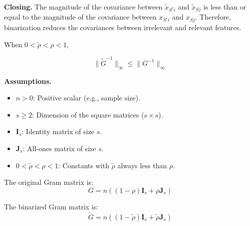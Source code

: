 \noindent\textbf{Closing.}
The magnitude of the covariance between $ \tilde{x}_{{S^c}i} $ and $ \tilde{x}_{Sj} $ is less than or equal to the magnitude of the covariance between $ x_{{S^c}i} $ and $ x_{Sj} $. Therefore, binarization reduces the covariances between irrelevant and relevant features.


\begin{lemma}\label{lem:app-inverse-norm-bound}
When $ 0 < \tilde{\rho} < \rho < 1 $,

\begin{equation}\label{eq:app-lemma4-inverse-norm-goal}
\|\tilde{G}^{-1}\|_\infty \leq  \|G^{-1}\|_\infty 
\end{equation}
\end{lemma}

\noindent\textbf{Assumptions.}

{
	\small
	\begin{itemize}
		\item $ n > 0 $: Positive scalar (e.g., sample size).
		\item $ s \geq 2 $: Dimension of the square matrices ($ s \times s $).
		\item $ \mathbf{I}_s $: Identity matrix of size $ s $.
		\item $ \mathbf{J}_s $: All-ones matrix of size $ s $.
		\item $ 0 < \tilde{\rho} < \rho < 1 $: Constants with $ \tilde{\rho} $ always less than $ \rho $.
	\end{itemize}
}

The original Gram matrix is:
\begin{equation}\label{eq:app-lemma4-raw-gram}
G = n \left( (1 - \rho) \mathbf{I}_s + \rho \mathbf{J}_s \right)
\end{equation}

The binarized Gram matrix is:
\begin{equation}\label{eq:app-lemma4-binarized-gram}
\tilde{G} = n \left( (1 - \tilde{\rho}) \mathbf{I}_s + \tilde{\rho} \mathbf{J}_s \right)
\end{equation}

